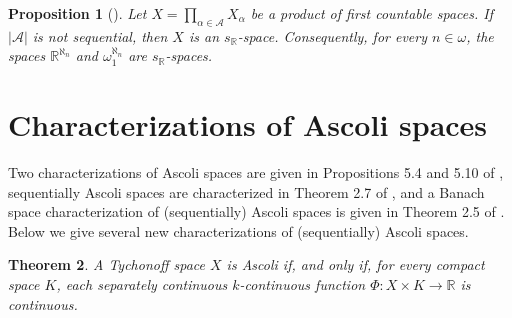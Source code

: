 \documentclass[preprint,11pt]{elsarticle}
\newtheorem{theorem}{Theorem}[section]
\newtheorem{proposition}[theorem]{Proposition}
\numberwithin{equation}{section}
\numberwithin{theorem}{section}
\newcommand{\IR}{\mathbb{R}}
\newcommand{\AAA}{\mathcal{A}}
\begin{document}
\begin{proposition}[{\protect\cite[Proposition~4.4]{GR-kR-sR}}]  \label{p:noble:fc-prod}
Let $X=\prod_{\alpha\in \AAA}X_\alpha$ be a product of first countable spaces. If  $|\AAA|$ is not sequential, then  $X$ is an $s_\IR$-space.
Consequently, for every $n\in\omega$, the spaces $\IR^{\aleph_n}$ and $\omega_1^{\aleph_n}$ are $s_\IR$-spaces.
\end{proposition}










\section{Characterizations of Ascoli spaces} \label{sec:Ascoli-spaces}



Two characterizations of Ascoli spaces are given in Propositions 5.4 and 5.10 of \cite{BG}, sequentially Ascoli spaces are characterized in Theorem 2.7 of \cite{Gabr-seq-Ascoli}, and a Banach space characterization of (sequentially) Ascoli spaces is given in Theorem 2.5 of \cite{Gabr-Ascoli-Banach}. Below we give several new characterizations of (sequentially) Ascoli spaces.


\begin{theorem} \label{t:Acoli-scf}
A Tychonoff space $X$ is Ascoli if, and only if, for every compact space $K$, each separately continuous $k$-continuous function $\Phi:X\times K\to \IR$ is continuous.
\end{theorem}
\end{document}
